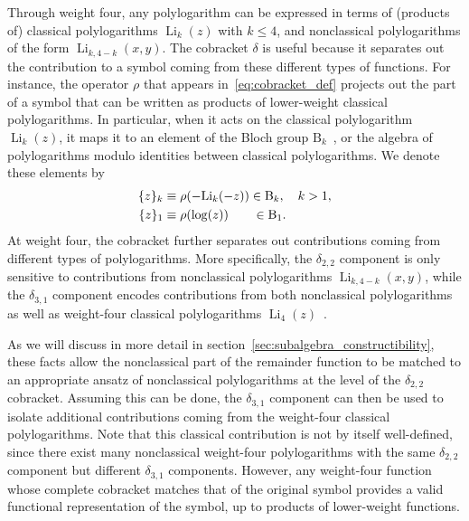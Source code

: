 \documentclass[11pt]{article}
\DeclareMathOperator{\Li}{Li}
\begin{document}
Through weight four, any polylogarithm can be expressed in terms of (products of) classical polylogarithms $\Li_k(z)$ with $k \leq 4$, and nonclassical polylogarithms of the form $\Li_{k,4-k}(x,y)$. The cobracket $\delta$ is useful because it separates out the contribution to a symbol coming from these different types of functions. For instance, the operator $\rho$ that appears in~\eqref{eq:cobracket_def} projects out the part of a symbol that can be written as products of lower-weight classical polylogarithms. In particular, when it acts on the classical polylogarithm $\Li_k(z)$, it maps it to an element of the Bloch group $\text{B}_k$~\cite{Bloch:2000, Suslin:1990}, or the algebra of polylogarithms modulo identities between classical polylogarithms. We denote these elements by
\begin{align}
 \{ z \}_k  &\equiv \rho(-\text{Li}_k(-z)) \in \text{B}_k, \quad k>1, \\
 \{ z \}_1  &\equiv \rho(\log(z)) \hspace{.675cm} \in \text{B}_1.
\end{align}
At weight four, the cobracket further separates out contributions coming from different types of polylogarithms. More specifically, the $\delta_{2,2}$ component is only sensitive to contributions from nonclassical polylogarithms $\Li_{k,4-k}(x,y)$, while the $\delta_{3,1}$ component encodes contributions from both nonclassical polylogarithms as well as weight-four classical polylogarithms $\Li_4(z)$~\cite{G91a,2008arXiv0809.3984D,GanglPolylogIdentities,2018arXiv180107816G,2018arXiv180308585G}. 

As we will discuss in more detail in section~\ref{sec:subalgebra_constructibility}, these facts allow the nonclassical part of the remainder function to be matched to an appropriate ansatz of nonclassical polylogarithms at the level of the $\delta_{2,2}$ cobracket. Assuming this can be done, the $\delta_{3,1}$ component can then be used to isolate additional contributions coming from the weight-four classical polylogarithms. Note that this classical contribution is not by itself well-defined, since there exist many nonclassical weight-four polylogarithms with the same $\delta_{2,2}$ component but different $\delta_{3,1}$ components. However, any weight-four function whose complete cobracket matches that of the original symbol provides a valid functional representation of the symbol, up to products of lower-weight functions.  
\end{document}
